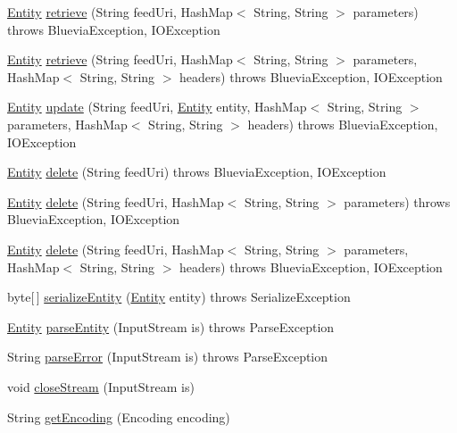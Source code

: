 \begin{DoxyCompactItemize}
\item 
\hyperlink{interfacecom_1_1bluevia_1_1commons_1_1Entity}{Entity} \hyperlink{classcom_1_1bluevia_1_1commons_1_1client_1_1BVBaseClient_ae9b81cbb4072a9fd44a5c5118fc723c9}{retrieve} (String feedUri, HashMap$<$ String, String $>$ parameters)  throws BlueviaException, IOException 
\item 
\hyperlink{interfacecom_1_1bluevia_1_1commons_1_1Entity}{Entity} \hyperlink{classcom_1_1bluevia_1_1commons_1_1client_1_1BVBaseClient_a7eff5b7868b55350cc09d1d2aad51812}{retrieve} (String feedUri, HashMap$<$ String, String $>$ parameters, HashMap$<$ String, String $>$ headers)  throws BlueviaException, IOException 
\item 
\hyperlink{interfacecom_1_1bluevia_1_1commons_1_1Entity}{Entity} \hyperlink{classcom_1_1bluevia_1_1commons_1_1client_1_1BVBaseClient_a604e63350d646d80324cf4b19e24af24}{update} (String feedUri, \hyperlink{interfacecom_1_1bluevia_1_1commons_1_1Entity}{Entity} entity, HashMap$<$ String, String $>$ parameters, HashMap$<$ String, String $>$ headers)  throws BlueviaException, IOException 
\item 
\hyperlink{interfacecom_1_1bluevia_1_1commons_1_1Entity}{Entity} \hyperlink{classcom_1_1bluevia_1_1commons_1_1client_1_1BVBaseClient_a967cae5af853619a86b1e63c0db7d503}{delete} (String feedUri)  throws BlueviaException, IOException 
\item 
\hyperlink{interfacecom_1_1bluevia_1_1commons_1_1Entity}{Entity} \hyperlink{classcom_1_1bluevia_1_1commons_1_1client_1_1BVBaseClient_a226580299b21a59fabdb5c3e6758b46f}{delete} (String feedUri, HashMap$<$ String, String $>$ parameters)  throws BlueviaException, IOException 
\item 
\hyperlink{interfacecom_1_1bluevia_1_1commons_1_1Entity}{Entity} \hyperlink{classcom_1_1bluevia_1_1commons_1_1client_1_1BVBaseClient_a49b348860f63dfdbfb4cdeb98469addd}{delete} (String feedUri, HashMap$<$ String, String $>$ parameters, HashMap$<$ String, String $>$ headers)  throws BlueviaException, IOException 
\item 
byte\mbox{[}$\,$\mbox{]} \hyperlink{classcom_1_1bluevia_1_1commons_1_1client_1_1BVBaseClient_a7999572e9b282714fc622d5145a926b2}{serializeEntity} (\hyperlink{interfacecom_1_1bluevia_1_1commons_1_1Entity}{Entity} entity)  throws SerializeException 
\item 
\hyperlink{interfacecom_1_1bluevia_1_1commons_1_1Entity}{Entity} \hyperlink{classcom_1_1bluevia_1_1commons_1_1client_1_1BVBaseClient_a1890d00576caefd957998abadc21c0ca}{parseEntity} (InputStream is)  throws ParseException 
\item 
String \hyperlink{classcom_1_1bluevia_1_1commons_1_1client_1_1BVBaseClient_ae9db53301966dc75f76d713e7814f672}{parseError} (InputStream is)  throws ParseException 
\item 
void \hyperlink{classcom_1_1bluevia_1_1commons_1_1client_1_1BVBaseClient_adb99b65fc347618835d39804987b558a}{closeStream} (InputStream is)
\item 
String \hyperlink{classcom_1_1bluevia_1_1commons_1_1client_1_1BVBaseClient_ad9de9adb8d3e131a932e29118c505c9a}{getEncoding} (Encoding encoding)
\end{DoxyCompactItemize}
